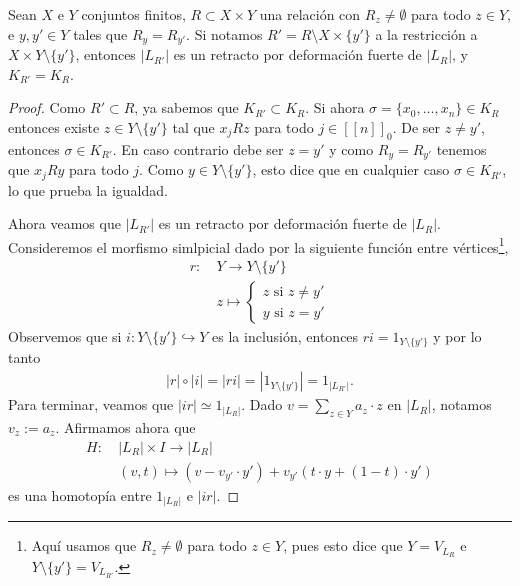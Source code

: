 \documentclass[11pt]{article}
\newcommand{\nat}[1]{[\![#1]\!]}
\newcommand{\natzero}[1]{\nat{#1}_0}
\newcommand{\paint}[1]{\color{color}{#1}}
\newenvironment{lemma}[2][Lema]{\begin{trivlist}
\item[\hskip \labelsep \paint{{\bfseries #1}}\hskip \labelsep {\bfseries #2.}]}{\end{trivlist}}
\begin{document}
\begin{lemma}{7} Sean $X$ e $Y$ conjuntos finitos, $R \subset X \times Y$ una relaci\'on con $R_z \neq  \emptyset$ para todo $z \in Y$, e $y,y' \in Y$ tales que $R_y = R_{y'}$.  Si notamos $R'= R \setminus X \times \{y'\}$ a la restricci\'on a $X \times Y \setminus \{y'\}$, entonces $|L_{R'}|$ es un retracto por deformaci\'on fuerte de $|L_R|$, y $K_{R'} = K_{R}$.
\end{lemma}
\begin{proof} Como $R' \subset R$, ya sabemos que $K_{R'} \subset K_R$. Si ahora $\sigma = \{x_0, \dots, x_n \} \in K_{R}$ entonces existe $z \in Y \setminus \{y'\}$ tal que $x_jRz$ para todo $j \in \natzero{n}$. De ser $z \neq y'$, entonces $\sigma \in K_{R'}$. En caso contrario debe ser $z = y'$ y como $R_y = R_{y'}$ tenemos que $x_jRy$ para todo $j$. Como $y \in Y \setminus \{y'\}$, esto dice que en cualquier caso $\sigma \in K_{R'}$, lo que prueba la igualdad.

Ahora veamos que $|L_{R'}|$ es un retracto por deformaci\'on fuerte de $|L_R|$. Consideremos el morfismo simlpicial dado por la siguiente funci\'on entre v\'ertices\footnote{Aqu\'i usamos que $R_z \neq \emptyset$ para todo $z \in Y$, pues esto dice que $Y = V_{L_R}$ e $Y \setminus \{y'\} = V_{L_{R'}}$.},
\begin{align*}
r : \ &Y \to Y \setminus \{y'\}\\ 
& z \mapsto \begin{cases}
z \text{ si $z \neq y'$}\\
y \text{ si $z = y'$}
\end{cases}
\end{align*}
Observemos que si $i : Y \setminus \{y'\} \hookrightarrow Y$ es la inclusi\'on, entonces $ri = 1_{Y \setminus \{y'\}}$ y por lo tanto
\begin{align*}
|r| \circ |i| = |ri| = |1_{Y \setminus \{y'\}}| = 1_{|L_{R'}|}.
\end{align*}
Para terminar, veamos que $|ir| \simeq 1_{|L_R|}$. Dado $v = \sum_{z \in Y}a_z \cdot z$ en $|L_{R}|$, notamos $v_z := a_z$. Afirmamos ahora que
\begin{align*}
H : \ &|L_R| \times I \longrightarrow |L_R|\\
& (v,t) \mapsto (v - v_{y'} \cdot y') + v_{y'}(t \cdot y + (1-t) \cdot y')
\end{align*}
es una homotop\'ia entre $1_{|L_R|}$ e $|ir|$. 


\end{proof}
\end{document}

